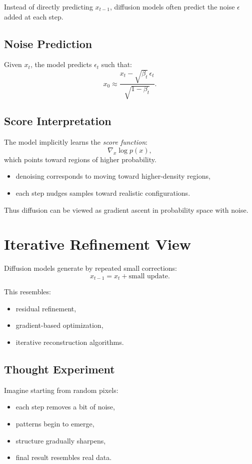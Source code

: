 Instead of directly predicting $x_{t-1}$, diffusion models often predict the noise $\epsilon$ added at each step.

\subsection{Noise Prediction}

Given $x_t$, the model predicts $\epsilon_t$ such that:
\[
x_0 \approx \frac{x_t - \sqrt{\beta_t}\,\epsilon_t}{\sqrt{1-\beta_t}}.
\]

\subsection{Score Interpretation}

The model implicitly learns the \emph{score function}:
\[
\nabla_x \log p(x),
\]
which points toward regions of higher probability.

\begin{itemize}
    \item denoising corresponds to moving toward higher-density regions,
    \item each step nudges samples toward realistic configurations.
\end{itemize}

Thus diffusion can be viewed as gradient ascent in probability space with noise.

\section{Iterative Refinement View}

Diffusion models generate by repeated small corrections:
\[
x_{t-1} = x_t + \text{small update}.
\]

This resembles:
\begin{itemize}
    \item residual refinement,
    \item gradient-based optimization,
    \item iterative reconstruction algorithms.
\end{itemize}

\subsection{Thought Experiment}

Imagine starting from random pixels:
\begin{itemize}
    \item each step removes a bit of noise,
    \item patterns begin to emerge,
    \item structure gradually sharpens,
    \item final result resembles real data.
\end{itemize}

